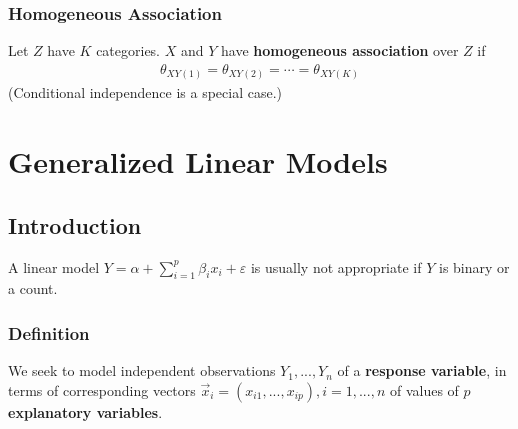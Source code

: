 \documentclass[11pt]{elegantbook}
\begin{document}
\subsection{Homogeneous Association}
\begin{definition}
    \normalfont
    Let $Z$ have $K$ categories. $X$ and $Y$ have \textbf{homogeneous association} over $Z$ if
    \begin{equation}
        \begin{aligned}
            \theta_{XY(1)}=\theta_{XY(2)}=\cdots=\theta_{XY(K)}
        \end{aligned}
        \nonumber
    \end{equation}
    (Conditional independence is a special case.)
\end{definition}

\chapter{Generalized Linear Models}
\section{Introduction}
A linear model $Y=\alpha+\sum_{i=1}^p \beta_i x_i +\varepsilon$ is usually not appropriate if $Y$ is binary or a count.

\subsection{Definition}
We seek to model independent observations $Y_1,...,Y_n$ of a \textbf{response variable}, in terms of corresponding vectors $\vec{x}_i=(x_{i1},...,x_{ip}),i=1,...,n$ of values of $p$ \textbf{explanatory variables}.
\end{document}

